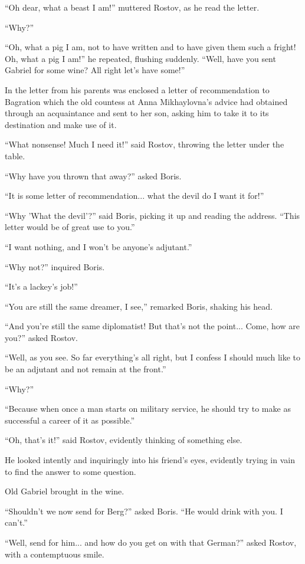 ``Oh dear, what a beast I am!'' muttered Rostov, as he read the
letter.

``Why?''

``Oh, what a pig I am, not to have written and to have given them
such a fright! Oh, what a pig I am!'' he repeated, flushing
suddenly. ``Well, have you sent Gabriel for some wine? All right
let's have some!''

In the letter from his parents was enclosed a letter of
recommendation to Bagration which the old countess at Anna
Mikhaylovna's advice had obtained through an acquaintance and
sent to her son, asking him to take it to its destination and
make use of it.

``What nonsense! Much I need it!'' said Rostov, throwing the
letter under the table.

``Why have you thrown that away?'' asked Boris.

``It is some letter of recommendation... what the devil do I want
it for!''

``Why 'What the devil'?'' said Boris, picking it up and reading
the address. ``This letter would be of great use to you.''

``I want nothing, and I won't be anyone's adjutant.''

``Why not?'' inquired Boris.

``It's a lackey's job!''

``You are still the same dreamer, I see,'' remarked Boris,
shaking his head.

``And you're still the same diplomatist! But that's not the
point...  Come, how are you?'' asked Rostov.

``Well, as you see. So far everything's all right, but I confess
I should much like to be an adjutant and not remain at the
front.''

``Why?''

``Because when once a man starts on military service, he should
try to make as successful a career of it as possible.''

``Oh, that's it!'' said Rostov, evidently thinking of something
else.

He looked intently and inquiringly into his friend's eyes,
evidently trying in vain to find the answer to some question.

Old Gabriel brought in the wine.

``Shouldn't we now send for Berg?'' asked Boris. ``He would drink
with you.  I can't.''

``Well, send for him... and how do you get on with that German?''
asked Rostov, with a contemptuous smile.

